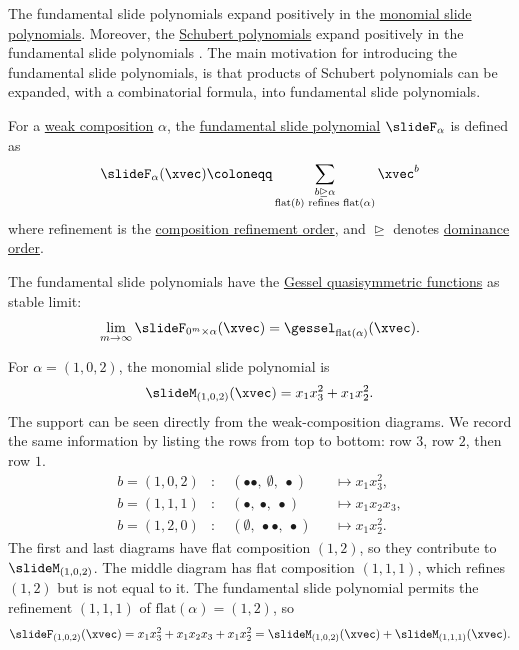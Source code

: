 The fundamental slide polynomials expand positively 
in the \hyperref[slideM]{monomial slide polynomials}.
Moreover, the \hyperref[schubert]{Schubert polynomials}
expand positively in the fundamental slide polynomials
\cite[Thm.~3.13]{AssafSearles2016}.
The main motivation for introducing the fundamental slide polynomials,
is that products of Schubert polynomials can be expanded, with a combinatorial
formula, into fundamental slide polynomials.

\begin{definition}
For a \hyperref[weakCompositionDefinition]{weak composition} $\alpha$, the
\hyperref[fundamentalSlidePolynomialDefinition]{fundamental slide polynomial}
$\slideF_\alpha$ is defined as
\[
\slideF_\alpha(\xvec)
\coloneqq
\sum_{\substack{b \trianglerighteq \alpha \\
                \mathrm{flat}(b)
                \text{ refines }
                \mathrm{flat}(\alpha)}}
\xvec^b
\]
where refinement is the
\hyperref[compositionRefinementOrder]{composition refinement order}, and
$\trianglerighteq$ denotes \hyperref[dominanceOrder]{dominance order}.
\end{definition}


The fundamental slide polynomials have the \hyperref[gessel]{Gessel quasisymmetric functions}
as stable limit:
\[
 \lim_{m \to \infty} \slideF_{0^m\times \alpha}(\xvec) = \gessel_{\mathrm{flat}(\alpha)}(\xvec).
\]

\begin{example}
For $\alpha=(1,0,2)$, the monomial slide polynomial is
\[
\slideM_{(1,0,2)}(\xvec)
=
x_1x_3^2+x_1x_2^2.
\]
The support can be seen directly from the weak-composition diagrams.  We record
the same information by listing the rows from top to bottom: row $3$, row $2$,
then row $1$.
\[
\begin{aligned}
b=(1,0,2)&:\quad
(\bullet\bullet,\ \emptyset,\ \bullet)
  &&\longmapsto x_1x_3^2,\\
b=(1,1,1)&:\quad
(\bullet,\ \bullet,\ \bullet)
  &&\longmapsto x_1x_2x_3,\\
b=(1,2,0)&:\quad
(\emptyset,\ \bullet\bullet,\ \bullet)
  &&\longmapsto x_1x_2^2.
\end{aligned}
\]
The first and last diagrams have flat composition $(1,2)$, so they contribute
to $\slideM_{(1,0,2)}$.  The middle diagram has flat composition $(1,1,1)$,
which refines $(1,2)$ but is not equal to it.
The fundamental slide polynomial permits the refinement $(1,1,1)$ of
$\mathrm{flat}(\alpha)=(1,2)$, so
\[
\slideF_{(1,0,2)}(\xvec)
=
x_1x_3^2+x_1x_2x_3+x_1x_2^2
=
\slideM_{(1,0,2)}(\xvec)+\slideM_{(1,1,1)}(\xvec).
\]
\end{example}

